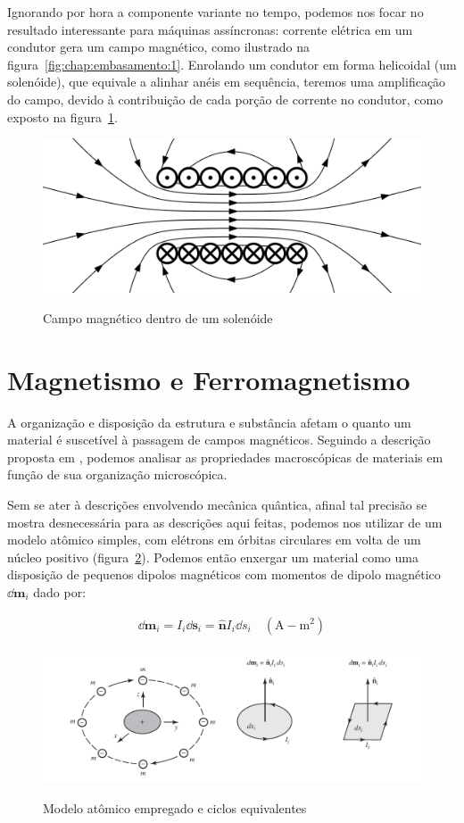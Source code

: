 \documentclass[
        12pt,                           %
        openright,                      %
        twoside,                        %
        a4paper,                        %
        english,                        %
        french,                         %
        spanish,                        %
        brazil                          %
        ]{abntex2}
\begin{document}
Ignorando por hora a componente variante no tempo, podemos nos focar no resultado
interessante para máquinas assíncronas: corrente elétrica em um condutor gera um
campo magnético, como ilustrado na figura~\ref{fig:chap:embasamento:1}. Enrolando
um condutor em forma helicoidal (um solenóide), que equivale a alinhar anéis em
sequência, teremos uma amplificação do campo, devido à contribuição de cada porção
de corrente no condutor, como exposto na figura~\ref{fig:chap:embasamento:2}.

\begin{figure}[!htp]
  \centering
  \includegraphics[width=0.5\columnwidth]{2560px-VFPt_Solenoid_correct2.svg.png}
  \label{fig:chap:embasamento:2}
  \caption{Campo magnético dentro de um solenóide}
\end{figure}

\section{Magnetismo e Ferromagnetismo}
A organização e disposição da estrutura e substância afetam o quanto um material
é suscetível à passagem de campos magnéticos. Seguindo a descrição proposta em
\cite{book:balanis}, podemos analisar as propriedades macroscópicas de materiais
em função de sua organização microscópica.\newline

Sem se ater à descrições envolvendo mecânica quântica, afinal tal precisão se mostra
desnecessária para as descrições aqui feitas, podemos nos utilizar de um modelo
atômico simples, com elétrons em órbitas circulares em volta de um núcleo positivo
(figura~\ref{fig:chap:embasamento:3}). Podemos então enxergar um material como uma
disposição de pequenos dipolos magnéticos com momentos de dipolo magnético $\dd \bm{m}_i$
dado por:

\begin{gather}
  \dd{\bm{m}_i} = I_i \dd \bm{s}_i = \bm{\hat{n}}I_i \dd s_i \quad (\text{A}-\text{m}^2)
\end{gather}

\begin{figure}[!htp]
  \centering
  \includegraphics[width=0.5\columnwidth]{balanis3.png}
  \label{fig:chap:embasamento:3}
  \caption{Modelo atômico empregado e ciclos equivalentes \cite{book:balanis}}
\end{figure}
\end{document}

